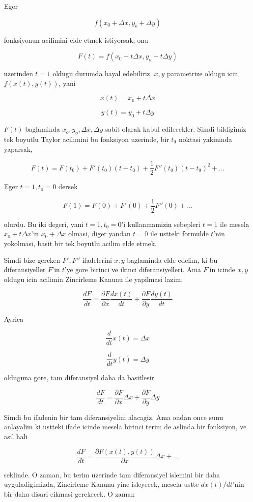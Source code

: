 \documentclass[12pt,fleqn]{article}\usepackage{../common}
\begin{document}
Eger 

$$ f(x_0 +\Delta x, y_o + \Delta y) $$

fonksiyonun acilimini elde etmek istiyorsak, onu

$$ F(t) = f(x_0 + t\Delta x, y_o + t\Delta y) $$

uzerinden $t=1$ oldugu durumda hayal edebiliriz. $x,y$ parametrize 
oldugu icin  $f(x(t),y(t))$, yani

$$ x(t) = x_0 + t\Delta x $$

$$ y(t) = y_0 + t\Delta y $$

$F(t)$ baglaminda $x_o, y_o, \Delta x, \Delta y$ sabit olarak kabul edilecekler. Simdi bildigimiz
tek boyutlu Taylor acilimini bu fonksiyon uzerinde, bir $t_0$ noktasi yakininda 
yaparsak,

$$ F(t) = F(t_0) + F'(t_0)(t-t_0) + \frac{1}{2}F''(t_0)(t-t_0)^2 + ... $$

Eger $t=1,t_0=0$ dersek

$$ F(1) = F(0) + F'(0) + \frac{1}{2}F''(0) + ... $$

olurdu. Bu iki degeri, yani $t=1,t_0=0$'i kullanmamizin sebepleri $t=1$ ile
mesela $x_0 + t\Delta x$'in $x_0 + \Delta x$ olmasi, diger yandan $t=0$ ile
ustteki formulde $t$'nin yokolmasi, basit bir tek boyutlu acilim elde
etmek.

Simdi bize gereken $F',F''$ ifadelerini $x,y$ baglaminda elde edelim, ki bu
diferansiyeller $F$'in $t$'ye gore birinci ve ikinci diferansiyelleri. Ama
$F$'in icinde $x,y$ oldugu icin acilimin Zincirleme Kanunu ile yapilmasi
lazim.

$$ \frac{dF}{dt} = \frac{\partial F}{\partial x}\frac{dx(t)}{dt} +
\frac{\partial F}{\partial y}\frac{dy(t)}{dt} 
 $$

Ayrica

$$ \frac{d}{dt}x(t) = \Delta x $$

$$ \frac{d}{dt}y(t) = \Delta y $$

olduguna gore, tam diferansiyel daha da basitlesir

$$ \frac{dF}{dt} = \frac{\partial F}{\partial x}\Delta x +
\frac{\partial F}{\partial y}\Delta y
 $$

Simdi bu ifadenin bir tam diferansiyelini alacagiz. Ama ondan once sunu
anlayalim ki ustteki ifade icinde mesela birinci terim de aslinda bir
fonksiyon, ve asil hali

$$ \frac{dF}{dt} = \frac{\partial F(x(t),y(t))}{\partial x}\Delta x + ...
 $$

seklinde. O zaman, bu terim uzerinde tam diferansiyel islemini bir daha
uyguladigimizda, Zincirleme Kanunu yine isleyecek, mesela ustte $dx(t)/dt$'nin 
bir daha disari cikmasi gerekecek. O zaman 
\end{document}
